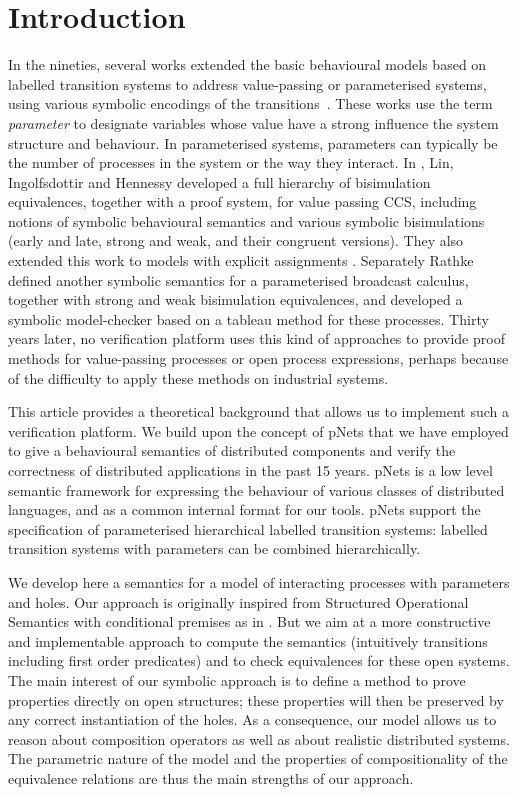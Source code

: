 \documentclass{elsarticle}
\begin{document}
\section{Introduction}

In the nineties, several 
works extended the basic behavioural models based on labelled
transition systems to address value-passing or parameterised systems, using
various symbolic encodings of the
transitions~\cite{deSimone85,Larsen87}. 
These works use the term \emph{parameter} to designate  variables whose value have a strong influence the system structure and behaviour. In parameterised systems, parameters can typically be the number of processes in the system or the way they interact.
In \cite{IngolfsdottirL:2001,HennessyLin:TCS95}, Lin, Ingolfsdottir and Hennessy developed a full hierarchy of
bisimulation equivalences, together with a proof system, for value passing CCS,
including notions of symbolic behavioural semantics and various symbolic 
bisimulations (early and late, strong and weak, and their congruent versions). They also extended this work to models with explicit assignments \cite{Lin:96}.
Separately Rathke~\cite{HennessyRathke:TCS98} defined another symbolic semantics for 
a parameterised broadcast calculus, together with strong and weak bisimulation
equivalences, and developed a symbolic model-checker based on a tableau
method for these processes. Thirty years later,  no verification platform uses this kind of approaches to provide proof methods for value-passing processes or open process expressions, perhaps because of the difficulty to apply these methods on industrial systems. 


This article provides a theoretical background that allows us to implement such a verification 
platform. We build upon the concept of pNets that we have employed to give a behavioural semantics 
of distributed components and verify the correctness of distributed applications in the past 15 years. pNets  is a
low level semantic framework for expressing the behaviour of various
classes of distributed languages, and as a common internal format for
our tools.  pNets support the
specification of parameterised hierarchical labelled
transition systems:  labelled transition systems with parameters can be
combined hierarchically.


We develop here a semantics for a model of interacting processes with parameters and holes. 
Our approach is originally inspired from Structured Operational Semantics with conditional premises as in \cite{GROOTE1993263,VANGLABBEEK2004229}.
But we aim at a more constructive and implementable approach to compute the semantics (intuitively transitions including first order predicates) and to 
check equivalences for these open systems.
The main interest of our symbolic approach is to define a method to
prove properties directly on open structures; these properties will then be preserved
by any correct instantiation of the holes.
As a consequence, our model allows us to reason about composition
operators as well as about realistic distributed systems. The parametric
nature of the model and the properties of compositionality of the
equivalence relations are thus  the main
strengths of  our approach. 
\end{document}
